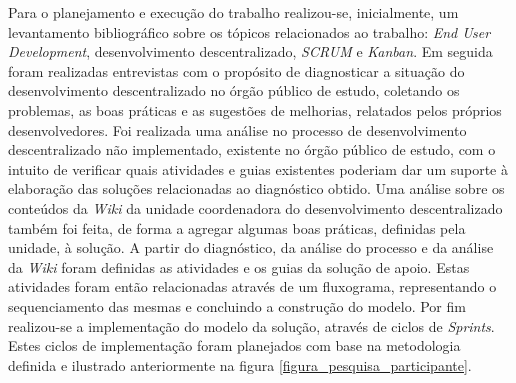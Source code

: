 Para o planejamento e execução do trabalho realizou-se, inicialmente, um levantamento bibliográfico sobre os tópicos relacionados ao trabalho: \textit{End User Development}, desenvolvimento descentralizado, \textit{SCRUM} e \textit{Kanban}. Em seguida foram realizadas entrevistas com o propósito de diagnosticar a situação do desenvolvimento descentralizado no órgão público de estudo, coletando os problemas, as boas práticas e as sugestões de melhorias, relatados pelos próprios desenvolvedores. Foi realizada uma análise no processo de desenvolvimento descentralizado não implementado, existente no órgão público de estudo, com o intuito de verificar quais atividades e guias existentes poderiam dar um suporte à elaboração das soluções relacionadas ao diagnóstico obtido. Uma análise sobre os conteúdos da \textit{Wiki} da unidade coordenadora do desenvolvimento descentralizado também foi feita, de forma a agregar algumas boas práticas, definidas pela unidade, à solução. A partir do diagnóstico, da análise do processo e da análise da \textit{Wiki} foram definidas as atividades e os guias da solução de apoio. Estas atividades foram então relacionadas através de um fluxograma, representando o sequenciamento das mesmas e concluindo a construção do modelo. Por fim realizou-se a implementação do modelo da solução, através de ciclos de \textit{Sprints}. Estes ciclos de implementação foram planejados com base na metodologia definida e ilustrado anteriormente na figura \ref{figura_pesquisa_participante}.

